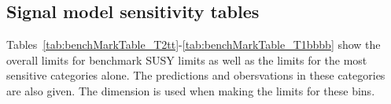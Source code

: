 \subsection{Signal model sensitivity tables}

Tables~\ref{tab:benchMarkTable_T2tt}-\ref{tab:benchMarkTable_T1bbbb} show the overall limits 
for benchmark SUSY limits as well as the limits for the most sensitive categories alone.
The predictions and obersvations in these categories are also given.
The \mht dimension is used when making the limits for these bins. 


\clearpage

\clearpage

\clearpage

\clearpage

\clearpage





